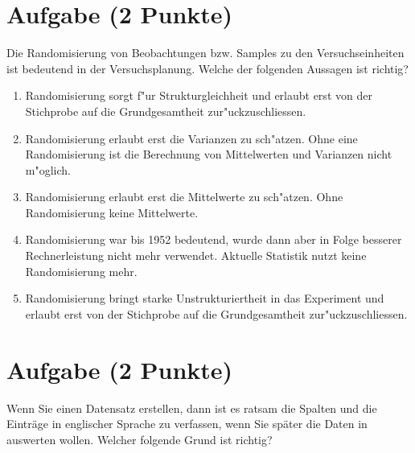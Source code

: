 \documentclass[a4paper, 10pt]{scrartcl}\usepackage[]{graphicx}\usepackage[]{xcolor}
\begin{document}
\section{Aufgabe \hfill (2 Punkte)}

Die Randomisierung von Beobachtungen bzw. Samples zu den Versuchseinheiten
ist bedeutend in der Versuchsplanung. Welche der folgenden Aussagen ist richtig?



\begin{enumerate}
\item [\textbf{A} \msquare] Randomisierung sorgt f{"u}r Strukturgleichheit und erlaubt erst von der Stichprobe auf die Grundgesamtheit zur{"u}ckzuschliessen.
\item [\textbf{B} \msquare] Randomisierung erlaubt erst die Varianzen zu sch{"a}tzen. Ohne eine Randomisierung ist die Berechnung von Mittelwerten und Varianzen nicht m{"o}glich.
\item [\textbf{C} \msquare] Randomisierung erlaubt erst die Mittelwerte zu sch{"a}tzen. Ohne Randomisierung keine Mittelwerte.
\item [\textbf{D} \msquare] Randomisierung war bis 1952 bedeutend, wurde dann aber in Folge besserer Rechnerleistung nicht mehr verwendet. Aktuelle Statistik nutzt keine Randomisierung mehr.
\item [\textbf{E} \msquare] Randomisierung bringt starke Unstrukturiertheit in das Experiment und erlaubt erst von der Stichprobe auf die Grundgesamtheit zur{"u}ckzuschliessen.
\end{enumerate}

\section{Aufgabe \hfill (2 Punkte)}

Wenn Sie einen Datensatz erstellen, dann ist es ratsam die Spalten und die
Eintr{\"a}ge in englischer Sprache zu verfassen, wenn Sie sp{\"a}ter die Daten in
\Rlogo auswerten wollen. Welcher folgende Grund ist richtig?
\end{document}
